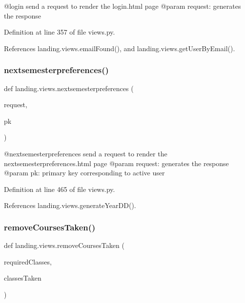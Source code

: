\begin{DoxyVerb}@login send a request to render the login.html page
@param request: generates the response
\end{DoxyVerb}
 

Definition at line 357 of file views.\+py.



References landing.\+views.\+email\+Found(), and landing.\+views.\+get\+User\+By\+Email().

\mbox{\label{namespacelanding_1_1views_ae0ecf1d0ea604a47a4617911d02051aa}} 
\subsubsection{\texorpdfstring{nextsemesterpreferences()}{nextsemesterpreferences()}}
{\footnotesize\ttfamily def landing.\+views.\+nextsemesterpreferences (\begin{DoxyParamCaption}\item[{}]{request,  }\item[{}]{pk }\end{DoxyParamCaption})}

\begin{DoxyVerb}@nextsemesterpreferences send a request to render the nextsemesterpreferences.html page
@param request: generates the response
@param pk: primary key corresponding to active user
\end{DoxyVerb}
 

Definition at line 465 of file views.\+py.



References landing.\+views.\+generate\+Year\+D\+D().

\mbox{\label{namespacelanding_1_1views_a0c09aa6ffb498dba6bae2f61fac3a37d}} 
\subsubsection{\texorpdfstring{remove\+Courses\+Taken()}{removeCoursesTaken()}}
{\footnotesize\ttfamily def landing.\+views.\+remove\+Courses\+Taken (\begin{DoxyParamCaption}\item[{}]{required\+Classes,  }\item[{}]{classes\+Taken }\end{DoxyParamCaption})}

